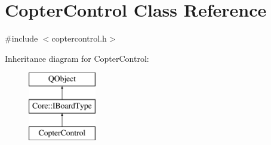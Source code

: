 \hypertarget{class_copter_control}{\section{Copter\-Control Class Reference}
\label{class_copter_control}
}


{\ttfamily \#include $<$coptercontrol.\-h$>$}

Inheritance diagram for Copter\-Control\-:\begin{figure}[H]
\begin{center}
\leavevmode
\includegraphics[height=3.000000cm]{class_copter_control}
\end{center}
\end{figure}
